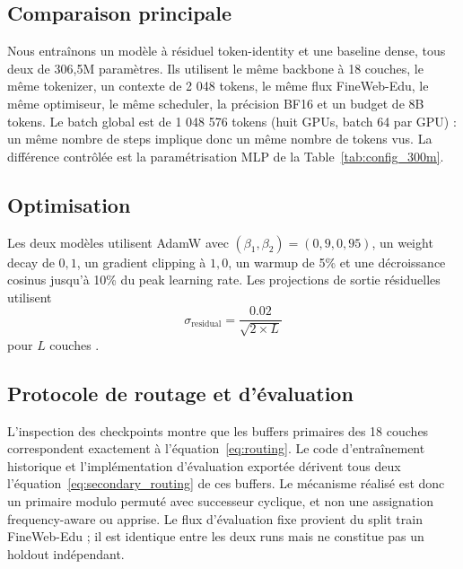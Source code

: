 \documentclass[10pt]{article}
\theoremstyle{definition}
\theoremstyle{remark}
\begin{document}
\subsection{Comparaison principale}
\label{sec:config_300m}

Nous entra\^{i}nons un mod\`{e}le \`{a} r\'{e}siduel token-identity et une baseline dense, tous deux de 306,5M param\`{e}tres. Ils utilisent le m\^{e}me backbone \`{a} 18 couches, le m\^{e}me tokenizer, un contexte de 2 048 tokens, le m\^{e}me flux FineWeb-Edu, le m\^{e}me optimiseur, le m\^{e}me scheduler, la pr\'{e}cision BF16 et un budget de 8B tokens. Le batch global est de 1 048 576 tokens (huit GPUs, batch 64 par GPU) : un m\^{e}me nombre de steps implique donc un m\^{e}me nombre de tokens vus. La diff\'{e}rence contr\^{o}l\'{e}e est la param\'{e}trisation MLP de la Table~\ref{tab:config_300m}.

\subsection{Optimisation}
\label{sec:training_recipe}

Les deux mod\`{e}les utilisent AdamW avec $(\beta_1,\beta_2)=(0,9,0,95)$, un weight decay de $0,1$, un gradient clipping \`{a} $1,0$, un warmup de 5\% et une d\'{e}croissance cosinus jusqu'\`{a} 10\% du peak learning rate. Les projections de sortie r\'{e}siduelles utilisent
\begin{equation}
\sigma_{\text{residual}} = \frac{0.02}{\sqrt{2 \times L}}
\end{equation}
pour $L$ couches \citep{radford2019language}.

\subsection{Protocole de routage et d'\'{e}valuation}
\label{sec:routing_verification}

L'inspection des checkpoints montre que les buffers primaires des 18 couches correspondent exactement \`{a} l'\'{e}quation~\ref{eq:routing}. Le code d'entra\^{i}nement historique et l'impl\'{e}mentation d'\'{e}valuation export\'{e}e d\'{e}rivent tous deux l'\'{e}quation~\ref{eq:secondary_routing} de ces buffers. Le m\'{e}canisme r\'{e}alis\'{e} est donc un primaire modulo permut\'{e} avec successeur cyclique, et non une assignation frequency-aware ou apprise. Le flux d'\'{e}valuation fixe provient du split train FineWeb-Edu ; il est identique entre les deux runs mais ne constitue pas un holdout ind\'{e}pendant.
\end{document}
